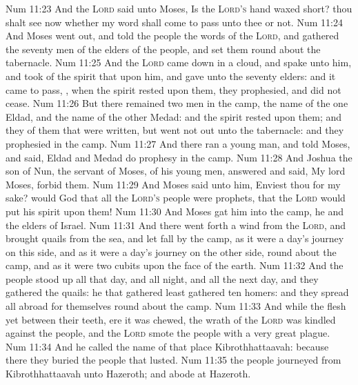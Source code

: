 \vs Num 11:23 And the \textsc{Lord} said unto Moses, Is the \textsc{Lord's} hand waxed short? thou shalt see now whether my word shall come to pass unto thee or not.
\vs Num 11:24 And Moses went out, and told the people the words of the \textsc{Lord}, and gathered the seventy men of the elders of the people, and set them round about the tabernacle.
\vs Num 11:25 And the \textsc{Lord} came down in a cloud, and spake unto him, and took of the spirit that  upon him, and gave  unto the seventy elders: and it came to pass, , when the spirit rested upon them, they prophesied, and did not cease.
\vs Num 11:26 But there remained two  men in the camp, the name of the one  Eldad, and the name of the other Medad: and the spirit rested upon them; and they  of them that were written, but went not out unto the tabernacle: and they prophesied in the camp.
\vs Num 11:27 And there ran a young man, and told Moses, and said, Eldad and Medad do prophesy in the camp.
\vs Num 11:28 And Joshua the son of Nun, the servant of Moses,  of his young men, answered and said, My lord Moses, forbid them.
\vs Num 11:29 And Moses said unto him, Enviest thou for my sake? would God that all the \textsc{Lord's} people were prophets,  that the \textsc{Lord} would put his spirit upon them!
\vs Num 11:30 And Moses gat him into the camp, he and the elders of Israel.
\vs Num 11:31 And there went forth a wind from the \textsc{Lord}, and brought quails from the sea, and let  fall by the camp, as it were a day's journey on this side, and as it were a day's journey on the other side, round about the camp, and as it were two cubits  upon the face of the earth.
\vs Num 11:32 And the people stood up all that day, and all  night, and all the next day, and they gathered the quails: he that gathered least gathered ten homers: and they spread  all abroad for themselves round about the camp.
\vs Num 11:33 And while the flesh  yet between their teeth, ere it was chewed, the wrath of the \textsc{Lord} was kindled against the people, and the \textsc{Lord} smote the people with a very great plague.
\vs Num 11:34 And he called the name of that place Kibrothhattaavah: because there they buried the people that lusted.
\vs Num 11:35  the people journeyed from Kibrothhattaavah unto Hazeroth; and abode at Hazeroth.
